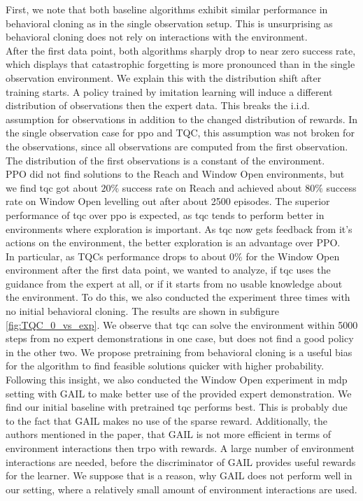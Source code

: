 First, we note that both baseline algorithms exhibit similar performance in behavioral cloning as in the single 
observation setup. This is unsurprising as behavioral cloning does not rely on interactions with the environment. \\

After the first data point, both algorithms sharply drop to near zero success rate, which displays that catastrophic forgetting is more 
pronounced than in the single observation environment. We explain this with the distribution shift after training starts. A policy trained by imitation learning 
will induce a different distribution of observations then the expert data. This breaks the i.i.d. assumption for observations in addition to the changed distribution of rewards. 
In the single observation case for \ac{ppo} and TQC, this assumption was not broken for the observations, 
since all observations are computed from the first observation. The distribution of the first observations is a constant of the environment.\\

PPO did not find solutions to the Reach and Window Open environments, 
but we find \ac{tqc} got about $20 \%$ success rate on Reach and achieved about $80 \%$ success rate on Window Open levelling out after about 2500 episodes. 
The superior performance of \ac{tqc} over \ac{ppo} is expected, as \ac{tqc} tends to perform better in environments where exploration is important. As \ac{tqc} now gets 
feedback from it's actions on the environment, the better exploration is an advantage over PPO.\\ 

In particular, as TQCs performance drops to about $0 \%$ for the Window Open 
environment after the first data point, we wanted to analyze, if \ac{tqc} uses the guidance from the expert at all, or if it starts from 
no usable knowledge about the environment. To do this, we also conducted the experiment three times with no initial behavioral cloning. The results are shown in 
subfigure \ref{fig:TQC_0_vs_exp}. We observe that \ac{tqc} can solve the environment within 5000 steps from no expert demonstrations in one case, but does not find a good policy in the other two. 
We propose pretraining from behavioral cloning is a useful bias for the algorithm to find feasible solutions quicker with higher probability.\\ 

Following this insight, 
we also conducted the Window Open experiment in \ac{mdp} setting with GAIL to make better use of the provided expert demonstration. We find our initial 
baseline with pretrained \ac{tqc} performs best. This is probably due to the fact that GAIL makes no use of the sparse reward. Additionally, 
the authors mentioned in the paper, that GAIL is not more efficient in terms of environment interactions then \ac{trpo} with rewards. A large number of 
environment interactions are needed, before the discriminator of GAIL provides useful rewards for the learner. We suppose that is a reason, why GAIL does not perform 
well in our setting, where a relatively small amount of environment interactions are used. \\

